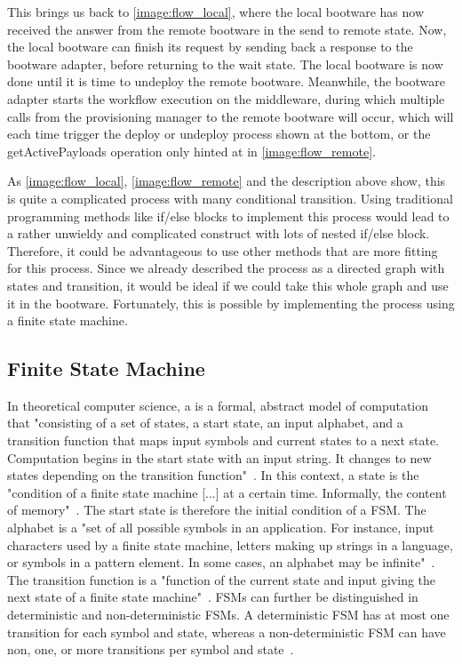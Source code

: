 This brings us back to \autoref{image:flow_local}, where the local bootware has now received the answer from the remote bootware in the send to remote state.
Now, the local bootware can finish its request by sending back a response to the bootware adapter, before returning to the wait state.
The local bootware is now done until it is time to undeploy the remote bootware.
Meanwhile, the bootware adapter starts the workflow execution on the middleware, during which multiple calls from the provisioning manager to the remote bootware will occur, which will each time trigger the deploy or undeploy process shown at the bottom, or the getActivePayloads operation only hinted at in \autoref{image:flow_remote}.

As \autoref{image:flow_local}, \autoref{image:flow_remote} and the description above show, this is quite a complicated process with many conditional transition.
Using traditional programming methods like if/else blocks to implement this process would lead to a rather unwieldy and complicated construct with lots of nested if/else block.
Therefore, it could be advantageous to use other methods that are more fitting for this process.
Since we already described the process as a directed graph with states and transition, it would be ideal if we could take this whole graph and use it in the bootware.
Fortunately, this is possible by implementing the process using a finite state machine.

\subsection{Finite State Machine}

In theoretical computer science, a  is a formal, abstract model of computation that "consisting of a set of states, a start state, an input alphabet, and a transition function that maps input symbols and current states to a next state. Computation begins in the start state with an input string. It changes to new states depending on the transition function"~\autocite{fsm}.
In this context, a state is the "condition of a finite state machine [...] at a certain time. Informally, the content of memory"~\autocite{state}.
The start state is therefore the initial condition of a FSM.
The alphabet is a "set of all possible symbols in an application. For instance, input characters used by a finite state machine, letters making up strings in a language, or symbols in a pattern element. In some cases, an alphabet may be infinite"~\autocite{alphabet}.
The transition function is a "function of the current state and input giving the next state of a finite state machine"~\autocite{transitionfn}.
FSMs can further be distinguished in deterministic and non-deterministic FSMs.
A deterministic FSM has at most one transition for each symbol and state, whereas a non-deterministic FSM can have non, one, or more transitions per symbol and state~\autocite{deterministic}.

